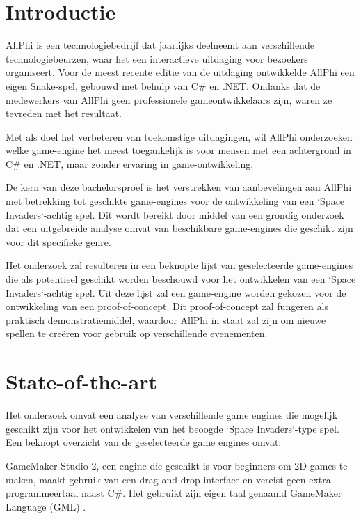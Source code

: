 
\section{Introductie}%
\label{sec:introductie}

AllPhi is een technologiebedrijf dat jaarlijks deelneemt aan verschillende technologiebeurzen, waar het een interactieve uitdaging voor bezoekers organiseert. Voor de meest recente editie van de uitdaging ontwikkelde AllPhi een eigen Snake-spel, gebouwd met behulp van C\# en .NET. Ondanks dat de medewerkers van AllPhi geen professionele gameontwikkelaars zijn, waren ze tevreden met het resultaat.

Met als doel het verbeteren van toekomstige uitdagingen, wil AllPhi onderzoeken welke game-engine het meest toegankelijk is voor mensen met een achtergrond in C\# en .NET, maar zonder ervaring in game-ontwikkeling.

De kern van deze bachelorsproef is het verstrekken van aanbevelingen aan AllPhi met betrekking tot geschikte game-engines voor de ontwikkeling van een `Space Invaders`-achtig spel. Dit wordt bereikt door middel van een grondig onderzoek dat een uitgebreide analyse omvat van beschikbare game-engines die geschikt zijn voor dit specifieke genre.

Het onderzoek zal resulteren in een beknopte lijst van geselecteerde game-engines die als potentieel geschikt worden beschouwd voor het ontwikkelen van een `Space Invaders`-achtig spel. Uit deze lijst zal een game-engine worden gekozen voor de ontwikkeling van een proof-of-concept. Dit proof-of-concept zal fungeren als praktisch demonstratiemiddel, waardoor AllPhi in staat zal zijn om nieuwe spellen te creëren voor gebruik op verschillende evenementen.



\section{State-of-the-art}%
\label{sec:state-of-the-art}

Het onderzoek omvat een analyse van verschillende game engines die mogelijk geschikt zijn voor het ontwikkelen van het beoogde `Space Invaders`-type spel. Een beknopt overzicht van de geselecteerde game engines omvat:

GameMaker Studio 2, een engine die geschikt is voor beginners om 2D-games te maken, maakt gebruik van een drag-and-drop interface en vereist geen extra programmeertaal naast C\#. Het gebruikt zijn eigen taal genaamd GameMaker Language (GML) \autocite{cossu2019game}.

